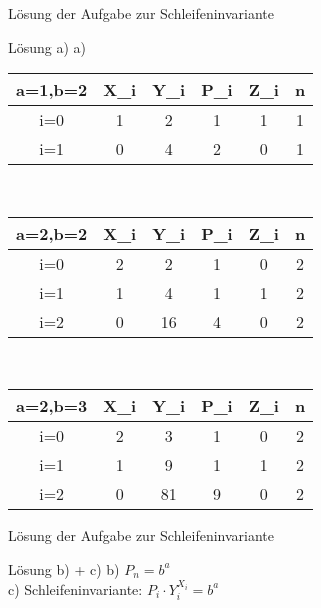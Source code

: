\begin{frame}{Lösung der Aufgabe zur Schleifeninvariante}
	\begin{block}{Lösung a)}
	\small
	a)
		\begin{center}\begin{tabular}{C C C C C C}
			 	a=1,b=2&X_i&Y_i&P_i&Z_i&n\\
				\hline
				i=0&1&2&1&1&1\\
				i=1&0&4&2&0&1\\
			\end{tabular}\\[10pt]
		\begin{tabular}{C C C C C C}
			 	a=2,b=2&X_i&Y_i&P_i&Z_i&n\\
				\hline
				i=0&2&2&1&0&2\\
				i=1&1&4&1&1&2\\
				i=2&0&16&4&0&2\\
		\end{tabular}\\[10pt]
		\begin{tabular}{C C C C C C}
			 	a=2,b=3&X_i&Y_i&P_i&Z_i&n\\
				\hline
				i=0&2&3&1&0&2\\
				i=1&1&9&1&1&2\\
				i=2&0&81&9&0&2\\
			\end{tabular}\end{center}
	\end{block}
\end{frame}

\begin{frame}{Lösung der Aufgabe zur Schleifeninvariante}
	\begin{block}{Lösung b) + c)}
		b) $P_n = b^{a}$\\
		c) Schleifeninvariante: $P_i \cdot Y_{i}^{X_i} = b^{a}$
	\end{block}
\end{frame}
\section{}
\questionframe
\lastframe
{}
